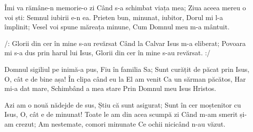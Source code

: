 \beginverse
Îmi va rămâne-n memorie-o zi
Când s-a schimbat viața mea;
Ziua aceea mereu o voi ști:
Semnul iubirii e-n ea.
Prieten bun, minunat, iubitor,
Dorul mi l-a împlinit;
Vesel voi spune măreața minune,
Cum Domnul meu m-a mântuit.
\endverse

\beginchorus
/: Glorii din cer în mine s-au revărsat
Când la Calvar Isus m-a eliberat;
Povoara mi s-a dus prin harul lui Isus,
Glorii din cer în mine s-au revărsat. :/
\endchorus

\beginverse
Domnul sigiliul pe inimă-a pus,
Fiu în familia Sa;
Sunt curățit de păcat prin Isus,
O, cât e de bine așa!
În clipa când eu la El am venit
Ca un sărman păcătos,
Har mi-a dat mare,
Schimbând a mea stare
Prin Domnul meu Isus Hristos.
\endverse

\beginverse
Azi am o nouă nădejde de sus,
Știu că sunt asigurat;
Sunt în cer moștenitor cu Isus,
O, cât e de minunat!
Toate le am din acea scumpă zi
Când m-am smerit și-am crezut;
Am nestemate, comori minunate
Ce ochii nicicând n-au văzut.
\endverse
\endsong